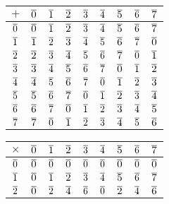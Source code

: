 \begin{center}
\setlength{\extrarowheight}{5pt}
\begin{tabular}{|c|cccccccc|}
\hline
\(+\) & \(\overline{0}\) & \(\overline{1}\) & \(\overline{2}\) & \(\overline{3}\) & \(\overline{4}\) & \(\overline{5}\) & \(\overline{6}\) & \(\overline{7}\) \\
\hline
\(\overline{0}\) & \(\overline{0}\) & \(\overline{1}\) & \(\overline{2}\) & \(\overline{3}\) & \(\overline{4}\) & \(\overline{5}\) & \(\overline{6}\) & \(\overline{7}\) \\
\(\overline{1}\) & \(\overline{1}\) & \(\overline{2}\) & \(\overline{3}\) & \(\overline{4}\) & \(\overline{5}\) & \(\overline{6}\) & \(\overline{7}\) & \(\overline{0}\) \\
\(\overline{2}\) & \(\overline{2}\) & \(\overline{3}\) & \(\overline{4}\) & \(\overline{5}\) & \(\overline{6}\) & \(\overline{7}\) & \(\overline{0}\) & \(\overline{1}\) \\
\(\overline{3}\) & \(\overline{3}\) & \(\overline{4}\) & \(\overline{5}\) & \(\overline{6}\) & \(\overline{7}\) & \(\overline{0}\) & \(\overline{1}\) & \(\overline{2}\) \\
\(\overline{4}\) & \(\overline{4}\) & \(\overline{5}\) & \(\overline{6}\) & \(\overline{7}\) & \(\overline{0}\) & \(\overline{1}\) & \(\overline{2}\) & \(\overline{3}\) \\
\(\overline{5}\) & \(\overline{5}\) & \(\overline{6}\) & \(\overline{7}\) & \(\overline{0}\) & \(\overline{1}\) & \(\overline{2}\) & \(\overline{3}\) & \(\overline{4}\) \\
\(\overline{6}\) & \(\overline{6}\) & \(\overline{7}\) & \(\overline{0}\) & \(\overline{1}\) & \(\overline{2}\) & \(\overline{3}\) & \(\overline{4}\) & \(\overline{5}\) \\
\(\overline{7}\) & \(\overline{7}\) & \(\overline{0}\) & \(\overline{1}\) & \(\overline{2}\) & \(\overline{3}\) & \(\overline{4}\) & \(\overline{5}\) & \(\overline{6}\) \\
\hline
\end{tabular}\qquad\qquad\qquad\begin{tabular}{|c|cccccccc|}
\hline
\(\times\) & \(\overline{0}\) & \(\overline{1}\) & \(\overline{2}\) & \(\overline{3}\) & \(\overline{4}\) & \(\overline{5}\) & \(\overline{6}\) & \(\overline{7}\) \\
\hline
\(\overline{0}\) & \(\overline{0}\) & \(\overline{0}\) & \(\overline{0}\) & \(\overline{0}\) & \(\overline{0}\) & \(\overline{0}\) & \(\overline{0}\) & \(\overline{0}\) \\
\(\overline{1}\) & \(\overline{0}\) & \(\overline{1}\) & \(\overline{2}\) & \(\overline{3}\) & \(\overline{4}\) & \(\overline{5}\) & \(\overline{6}\) & \(\overline{7}\) \\
\(\overline{2}\) & \(\overline{0}\) & \(\overline{2}\) & \(\overline{4}\) & \(\overline{6}\) & \(\overline{0}\) & \(\overline{2}\) & \(\overline{4}\) & \(\overline{6}\) \\

\end{tabular}
\end{center}
